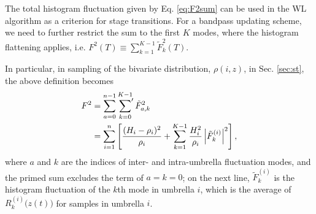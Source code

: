 \documentclass[reprint, superscriptaddress, floatfix]{revtex4-1}
\begin{document}

The total histogram fluctuation given by Eq. \eqref{eq:F2sum}
can be used in the WL algorithm
as a criterion for stage transitions.
%
For a bandpass updating scheme,
we need to further restrict the sum to the first $K$ modes,
where the histogram flattening applies, i.e.
$F^2(T) \equiv \sum_{k = 1}^{K-1} \tilde F_k^2(T)$.
%

In particular,
in sampling of the bivariate distribution,
$\rho(i, z)$, in Sec. \ref{sec:st},
the above definition becomes
\begin{align}
  F^2
  &=
  \sum_{a = 0}^{n - 1}
  \sideset{}{'}\sum_{k = 0}^{K - 1}
  \tilde F_{a, k}^2
  \notag \\
  &=
  \sum_{i=1}^n
  \left[
  \frac{ (H_i - \rho_i)^2 } { \rho_i }
  +
  \sum_{k = 1}^{K - 1}
  \frac{ H_i^2 } { \rho_i }
  \left|{\tilde F}_k^{(i)} \right|^2
  \right]
  ,
  \label{eq:F2st}
\end{align}
where $a$ and $k$ are the indices of
inter- and intra-umbrella fluctuation modes,
and the primed sum excludes
the term of $a = k = 0$;
on the next line, $\tilde F_k^{(i)}$
is the histogram fluctuation of the $k$th mode in umbrella $i$,
which is the average of $R_k^{(i)}\bigl( z(t) \bigr)$
for samples in umbrella $i$.
\end{document}
